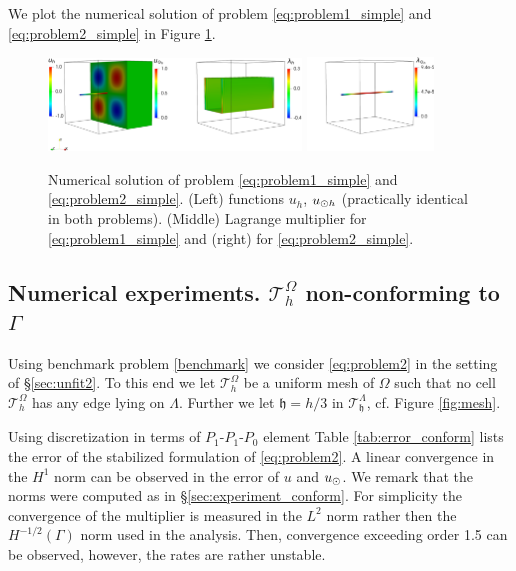 \documentclass[r]{siamart171218}
\begin{document}
We plot the numerical solution of problem \eqref{eq:problem1_simple} and \eqref{eq:problem2_simple} in
Figure \ref{fig:sol_benchm1}.

\begin{figure}
\centering
\includegraphics[width = 0.6\textwidth]{./graphics/mfs_LM2d}
\includegraphics[width = 0.3\textwidth]{./graphics/mfs_LM1d_crop}
\caption{Numerical solution of problem \eqref{eq:problem1_simple} and
  \eqref{eq:problem2_simple}. (Left) functions $u_h$, $u_{\odot h}$ (practically identical
  in both problems). (Middle) Lagrange multiplier for \eqref{eq:problem1_simple}
  and (right) for \eqref{eq:problem2_simple}.}
\label{fig:sol_benchm1}
\end{figure}




\subsection{Numerical experiments. $\mathcal{T}^{\Omega}_h$ non-conforming to $\Gamma$}\label{sec:experiment_nonconform}
Using benchmark problem \eqref{benchmark} we consider \eqref{eq:problem2} in the
setting of \S \ref{sec:unfit2}. To this end we let $\mathcal{T}^{\Omega}_h$ be a uniform
mesh of $\Omega$ such that no cell $\mathcal{T}^{\Omega}_h$ has any edge
lying on $\Lambda$. Further we let $\mathfrak{h}=h/3$ in $\mathcal{T}^{\Lambda}_{\mathfrak{h}}$,
cf. Figure \ref{fig:mesh}.

Using discretization in terms of $P_1$-$P_1$-$P_0$ element Table \ref{tab:error_conform}
lists the error of the stabilized formulation of \eqref{eq:problem2}. A linear
convergence in the $H^1$ norm can be observed in the error of $u$ and $u_{\odot}$. We
remark that the norms were computed as in \S\ref{sec:experiment_conform}. For simplicity
the convergence of the multiplier is measured in the $L^2$ norm rather then the $H^{-1/2}(\Gamma)$
norm used in the analysis. Then, convergence exceeding order 1.5 can be observed, however,
the rates are rather unstable.
\end{document}
